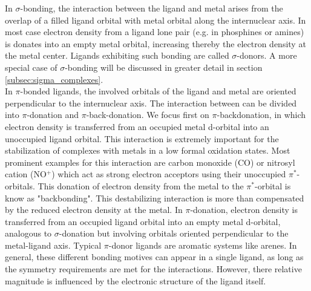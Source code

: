 \noindent
In $\sigma$-bonding, the interaction between the ligand and metal arises from the overlap of a filled ligand orbital with metal orbital along the internuclear axis. In most case electron density from a ligand lone pair (e.g. in phosphines or amines) is donates into an empty metal orbital, increasing thereby the electron density at the metal center. Ligands exhibiting such bonding are called $\sigma$-donors. A more special case of $\sigma$-bonding will be discussed in greater detail in section \ref{subsec:sigma_complexes}.\\
In $\pi$-bonded ligands, the involved orbitals of the ligand and metal are oriented perpendicular to the internuclear axis. The interaction between can be divided into $\pi$-donation and $\pi$-back-donation. We focus first on $\pi$-backdonation, in which electron density is transferred from an occupied metal d-orbital into an unoccupied ligand orbital. This interaction is extremely important for the stabilization of complexes with metals in a low formal oxidation states. Most prominent examples for this interaction are carbon monoxide (CO) or nitrosyl cation (NO$^{+}$) which act as strong electron acceptors using their unoccupied $\pi^{*}$-orbitals. This donation of electron density from the metal to the $\pi^{*}$-orbital is know as "backbonding". This destabilizing interaction is more than compensated by the reduced electron density at the metal. In $\pi$-donation, electron density is transferred from an occupied ligand orbital into an empty metal d-orbital, analogous to $\sigma$-donation but involving orbitals oriented perpendicular to the metal-ligand axis. Typical $\pi$-donor ligands are aromatic systems like arenes. In general, these different bonding motives can appear in a single ligand, as long as the symmetry requirements are met for the interactions. However, there relative magnitude is influenced by the electronic structure of the ligand itself. 

